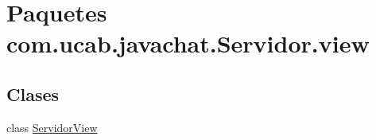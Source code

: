 \hypertarget{namespacecom_1_1ucab_1_1javachat_1_1_servidor_1_1view}{\section{Paquetes com.\-ucab.\-javachat.\-Servidor.\-view}
\label{namespacecom_1_1ucab_1_1javachat_1_1_servidor_1_1view}
}
\subsection*{Clases}
\begin{DoxyCompactItemize}
\item 
class \hyperlink{classcom_1_1ucab_1_1javachat_1_1_servidor_1_1view_1_1_servidor_view}{Servidor\-View}
\end{DoxyCompactItemize}
